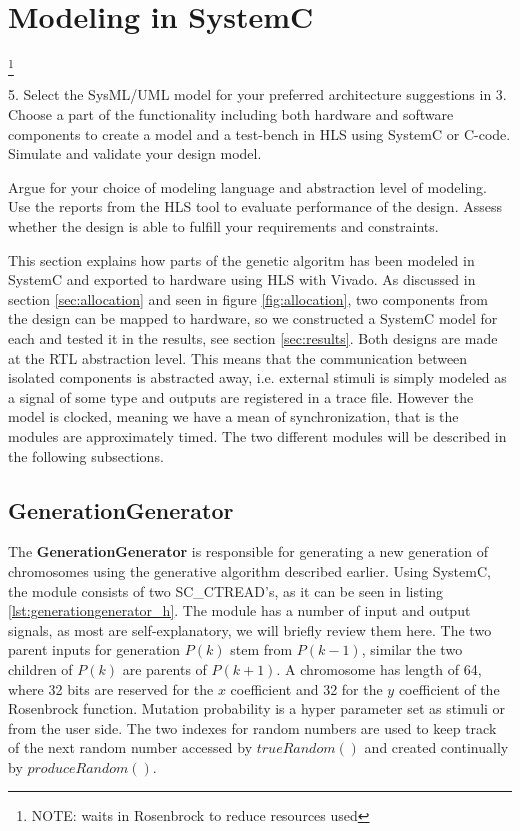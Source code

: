 \section{Modeling in SystemC}
\footnote{\color{red}NOTE: waits in Rosenbrock to reduce resources used}

\begin{framed}
5. Select the SysML/UML model for your preferred architecture suggestions in 3. Choose a part of the functionality including both hardware and software components to create a model and a test-bench in HLS using SystemC or C-code. Simulate and validate your design model.

Argue for your choice of modeling language and abstraction level of modeling. Use the reports from the HLS tool to evaluate performance of the design. Assess whether the design is able to fulfill your requirements and constraints.
\end{framed}

This section explains how parts of the genetic algoritm has been modeled in SystemC and exported to hardware using HLS with Vivado. As discussed in section \ref{sec:allocation} and seen in figure \ref{fig:allocation}, two components from the design can be mapped to hardware, so we constructed a SystemC model for each and tested it in the results, see section \ref{sec:results}. Both designs are made at the RTL abstraction level. This means that the communication between isolated components is abstracted away, i.e. external stimuli is simply modeled as a signal of some type and outputs are registered in a trace file. However the model is clocked, meaning we have a mean of synchronization, that is the modules are approximately timed. The two different modules will be described in the following subsections.

\subsection{GenerationGenerator}
The \textbf{GenerationGenerator} is responsible for generating a new generation of chromosomes using the generative algorithm described earlier. Using SystemC, the module consists of two SC\_CTREAD's, as it can be seen in listing \ref{lst:generationgenerator_h}. The module has a number of input and output signals, as most are self-explanatory, we will briefly review them here. The two parent inputs for generation $P(k)$ stem from $P(k-1)$, similar the two children of $P(k)$ are parents of $P(k+1)$. A chromosome has length of 64, where 32 bits are reserved for the $x$ coefficient and 32 for the $y$ coefficient of the Rosenbrock function. Mutation probability is a hyper parameter set as stimuli or from the user side. The two indexes for random numbers are used to keep track of the next random number accessed by $trueRandom()$ and created continually by $produceRandom()$.  

